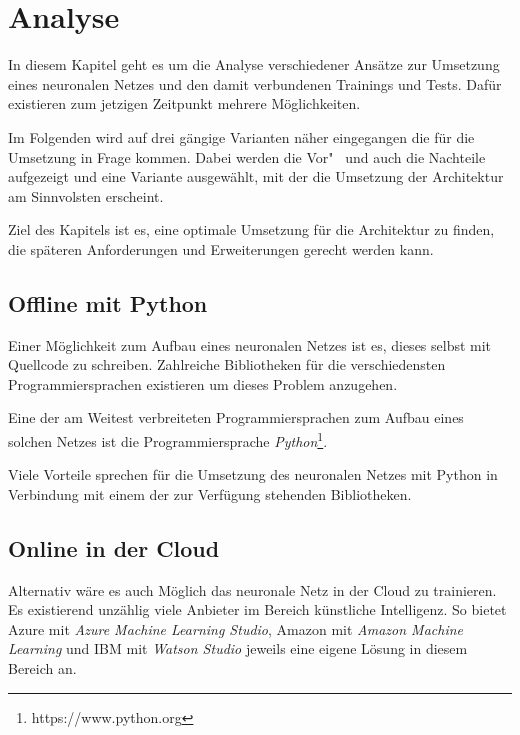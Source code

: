 \section{Analyse}
\label{sec:analyse}
In diesem Kapitel geht es um die Analyse verschiedener Ansätze zur Umsetzung eines neuronalen Netzes und den damit
verbundenen Trainings und Tests. Dafür existieren zum jetzigen Zeitpunkt mehrere Möglichkeiten.

Im Folgenden wird auf drei gängige Varianten näher eingegangen die für die Umsetzung in Frage kommen. Dabei werden die
Vor"~ und auch die Nachteile aufgezeigt und eine Variante ausgewählt, mit der die Umsetzung der Architektur am
Sinnvolsten erscheint.

Ziel des Kapitels ist es, eine optimale Umsetzung für die Architektur zu finden, die späteren Anforderungen und
Erweiterungen gerecht werden kann.

\subsection{Offline mit Python}
Einer Möglichkeit zum Aufbau eines neuronalen Netzes ist es, dieses selbst mit Quellcode zu schreiben. Zahlreiche
Bibliotheken für die verschiedensten Programmiersprachen existieren um dieses Problem anzugehen.

Eine der am Weitest verbreiteten Programmiersprachen zum Aufbau eines solchen Netzes ist die Programmiersprache
\textit{Python}\footnote{https://www.python.org}.

Viele Vorteile sprechen für die Umsetzung des neuronalen Netzes mit Python in Verbindung mit einem der zur Verfügung
stehenden Bibliotheken.


\subsection{Online in der Cloud}
Alternativ wäre es auch Möglich das neuronale Netz in der Cloud zu trainieren. Es existierend unzählig viele Anbieter im
Bereich künstliche Intelligenz. So bietet Azure mit \textit{Azure Machine Learning Studio}, Amazon mit
\textit{Amazon Machine Learning} und IBM mit \textit{Watson Studio} jeweils eine eigene Lösung in diesem Bereich an.



